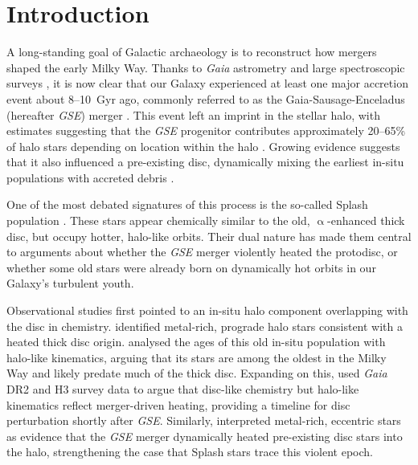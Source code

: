 \documentclass[fleqn,usenatbib]{mnras}
\begin{document}
\section{Introduction}
\label{sec:introduction}

A long-standing goal of Galactic archaeology is to reconstruct how mergers shaped the early Milky Way. Thanks to \textit{Gaia} astrometry \citep{Brown2021b} and large spectroscopic surveys \citep{Jofre2019}, it is now clear that our Galaxy experienced at least one major accretion event about 8--10~Gyr ago, commonly referred to as the Gaia-Sausage-Enceladus (hereafter \textit{GSE}) merger \citep{Haywood2018b, Belokurov2018, Helmi2018, Naidu2020}. This event left an imprint in the stellar halo, with estimates suggesting that the \textit{GSE} progenitor contributes approximately 20–65\% of halo stars depending on location within the halo \citep{Naidu2020}. Growing evidence suggests that it also influenced a pre-existing disc, dynamically mixing the earliest in-situ populations with accreted debris \citep[see review by][]{Helmi2020}.

One of the most debated signatures of this process is the so-called Splash population \citep{Belokurov2020, Belokurov2022}. These stars appear chemically similar to the old, $\upalpha$-enhanced thick disc, but occupy hotter, halo-like orbits. Their dual nature has made them central to arguments about whether the \textit{GSE} merger violently heated the protodisc, or whether some old stars were already born on dynamically hot orbits in our Galaxy’s turbulent youth.

Observational studies first pointed to an in-situ halo component overlapping with the disc in chemistry. \citet{Bonaca2017} identified metal-rich, prograde halo stars consistent with a heated thick disc origin. \citet{Gallart2019} analysed the ages of this old in-situ population with halo-like kinematics, arguing that its stars are among the oldest in the Milky Way and likely predate much of the thick disc. Expanding on this, \citet{Bonaca2020} used \textit{Gaia} DR2 and H3 survey data to argue that disc-like chemistry but halo-like kinematics reflect merger-driven heating, providing a timeline for disc perturbation shortly after \textit{GSE}. Similarly, \citet{DiMatteo2019,DiMatteo2020} interpreted metal-rich, eccentric stars as evidence that the \textit{GSE} merger dynamically heated pre-existing disc stars into the halo, strengthening the case that Splash stars trace this violent epoch.
\end{document}
